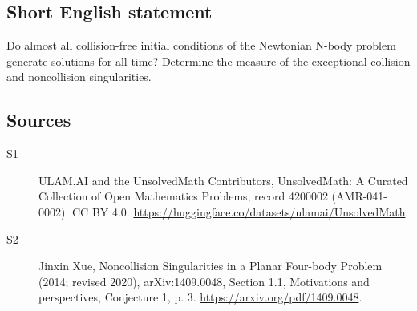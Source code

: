 \documentclass[11pt]{article}
\begin{document}
\subsection{Short English statement}
Do almost all collision-free initial conditions of the Newtonian N-body problem generate solutions for all time? Determine the measure of the exceptional collision and noncollision singularities.
\subsection{Sources}
\begin{description}
\item[\hypertarget{source:4200002:1}{S1}] ULAM.AI and the UnsolvedMath Contributors, UnsolvedMath: A Curated Collection of Open Mathematics Problems, record 4200002 (AMR-041-0002). CC BY 4.0. \url{https://huggingface.co/datasets/ulamai/UnsolvedMath}.
\item[\hypertarget{source:4200002:2}{S2}] Jinxin Xue, Noncollision Singularities in a Planar Four-body Problem (2014; revised 2020), arXiv:1409.0048, Section 1.1, Motivations and perspectives, Conjecture 1, p. 3. \url{https://arxiv.org/pdf/1409.0048}.
\end{description}
\label{end:4200002}
\end{document}
